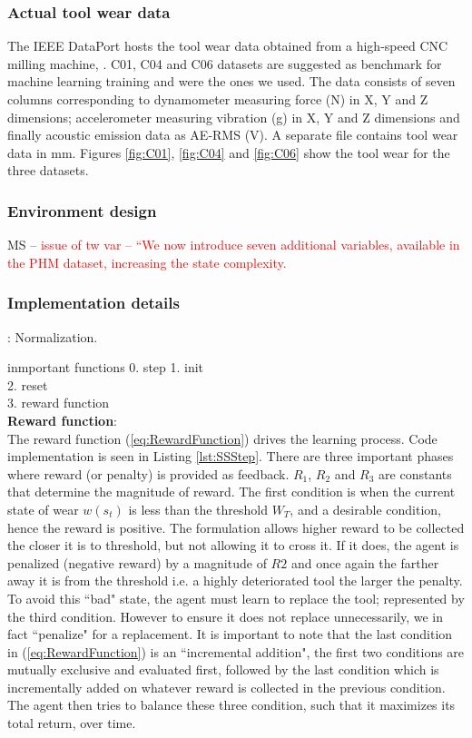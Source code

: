 \documentclass[a4paper, 12pt]{article}
\begin{document}
\subsubsection*{Actual tool wear data}

The IEEE DataPort hosts the tool wear data obtained from a high-speed CNC milling machine, \citep{NUAA-dataset}. C01, C04 and C06 datasets are suggested as benchmark for machine learning training and were the ones we used. The data consists of seven columns corresponding to dynamometer measuring force (N) in X, Y and Z dimensions; accelerometer measuring vibration (g) in X, Y and Z dimensions and finally acoustic emission data as AE-RMS (V). A separate file contains tool wear data in mm. Figures \ref{fig:C01}, \ref{fig:C04} and \ref{fig:C06} show the tool wear for the three datasets.

\subsubsection*{Environment design}

MS -- \textcolor{red}{issue of tw var -- ``We now introduce seven additional variables, available in the PHM dataset, increasing the state complexity.} 

\subsubsection*{Implementation details}: 
Normalization. 

inmportant functions
0. step
1. init \\
2. reset \\
3. reward function \\

\noindent\textbf{Reward function}:\\
The reward function (\ref{eq:RewardFunction}) drives the learning process. Code implementation is seen in Listing \ref{lst:SSStep}. There are three important phases where reward (or penalty) is provided as feedback. $R_1$, $R_2$ and $R_3$ are constants that determine the magnitude of reward. The first condition is when the current state of wear $w(s_t)$ is less than the threshold $W_T$, and a desirable condition, hence the reward is positive. The formulation allows higher reward to be collected the closer it is to threshold, but not allowing it to cross it. If it does, the agent is penalized (negative reward) by a magnitude of $R2$ and once again the farther away it is from the threshold i.e. a highly deteriorated tool the larger the penalty. To avoid this ``bad" state, the agent must learn to replace the tool; represented by the third condition. However to ensure it does not replace unnecessarily, we in fact ``penalize" for a replacement. It is important to note that the last condition in (\ref{eq:RewardFunction}) is an ``incremental addition", the first two conditions are mutually exclusive and evaluated first, followed by the last condition which is incrementally added on whatever reward is collected in the previous condition. The agent then tries to balance these three condition, such that it maximizes its total return, over time.
\end{document}

